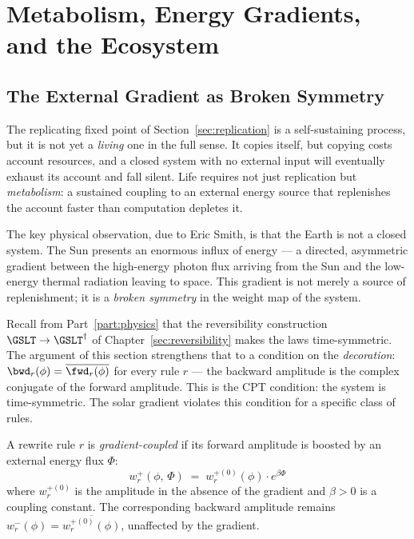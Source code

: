 \chapter{Metabolism, Energy Gradients, and the Ecosystem}
\label{sec:metabolism}

\section{The External Gradient as Broken Symmetry}

The replicating fixed point of Section~\ref{sec:replication} is a
self-sustaining process, but it is not yet a \emph{living} one in
the full sense.
It copies itself, but copying costs account resources, and a closed
system with no external input will eventually exhaust its account and
fall silent.
Life requires not just replication but \emph{metabolism}: a
sustained coupling to an external energy source that replenishes
the account faster than computation depletes it.

The key physical observation, due to Eric Smith, is that the
Earth is not a closed system.
The Sun presents an enormous influx of energy --- a directed,
asymmetric gradient between the high-energy photon flux arriving
from the Sun and the low-energy thermal radiation leaving to space.
This gradient is not merely a source of replenishment; it is a
\emph{broken symmetry} in the weight map of the system.

Recall from Part~\ref{part:physics} that the reversibility construction
$\GSLT \to \GSLT^\dagger$ of Chapter~\ref{sec:reversibility} makes the laws
time-symmetric.  The argument of this section strengthens that to a condition on
the \emph{decoration}: $\bwd_r(\phi) = \overline{\fwd_r(\phi)}$ for every rule
$r$ --- the backward amplitude is the complex conjugate of the forward
amplitude.
This is the CPT condition: the system is time-symmetric.
The solar gradient violates this condition for a specific class
of rules.

\begin{definition}
A rewrite rule $r$ is \emph{gradient-coupled} if its forward
amplitude is boosted by an external energy flux $\Phi$:
\[
  w^+_r(\phi,\, \Phi) \;=\; w^{+(0)}_r(\phi) \cdot e^{\beta\Phi}
\]
where $w^{+(0)}_r$ is the amplitude in the absence of the
gradient and $\beta > 0$ is a coupling constant.
The corresponding backward amplitude remains
$w^-_r(\phi) = \overline{w^{+(0)}_r(\phi)}$, unaffected by the
gradient.
\end{definition}

